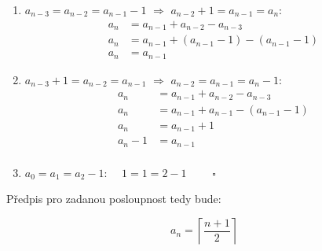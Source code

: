 \documentclass[12pt]{article}
\begin{document}
\begin{enumerate}
\begin{enumerate}
        \begin{enumerate}
          \item \colorbox{suddenblue}{$a_{n-3} = a_{n-2} = a_{n-1}-1$} $\Longrightarrow$ \colorbox{suddenpeach}{$a_{n-2} + 1 = a_{n-1} = a_n$}:
            \begin{align*}
              a_n &= a_{n-1} + a_{n-2} - a_{n-3} \\
              a_n &= a_{n-1} + (a_{n-1}-1) - (a_{n-1}-1) \\
              a_n &= a_{n-1}
            \end{align*}
          \item \colorbox{suddenpeach}{$a_{n-3}+1 = a_{n-2} = a_{n-1}$} $\Longrightarrow$ \colorbox{suddenblue}{$a_{n-2} = a_{n-1} = a_n - 1$}:
            \begin{align*}
              a_n &= a_{n-1} + a_{n-2} - a_{n-3} \\
              a_n &= a_{n-1} + a_{n-1} - (a_{n-1}-1) \\
              a_n &= a_{n-1} + 1 \\
              a_n - 1 &= a_{n-1} \\
            \end{align*}
          \item \colorbox{suddenblue}{$a_0 = a_1 = a_2 - 1$}: $\quad 1=1=2-1$ \checkmark $\quad\quad\square$
        \end{enumerate}
      
      Předpis pro zadanou posloupnost tedy bude:

      \[
        a_n = \left\lceil \frac{n+1}{2} \right\rceil
      \]
  \end{enumerate}
    

\end{enumerate}
\end{document}
